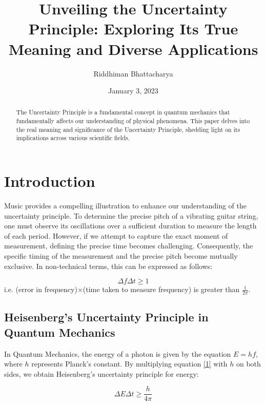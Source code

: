 \documentclass{article}
\begin{document}
\title{\Huge \textbf{Unveiling the Uncertainty Principle: Exploring Its True Meaning and Diverse Applications}}

\author{Riddhiman Bhattacharya}
\date{January 3, 2023}
\maketitle

\begin{abstract}
The Uncertainty Principle is a fundamental concept in quantum mechanics that fundamentally affects our understanding of physical phenomena. This paper delves into the real meaning and significance of the Uncertainty Principle, shedding light on its implications across various scientific fields.
\end{abstract}

\section{Introduction}

Music provides a compelling illustration to enhance our understanding of the uncertainty principle. To determine the precise pitch of a vibrating guitar string, one must observe its oscillations over a sufficient duration to measure the length of each period. However, if we attempt to capture the exact moment of measurement, defining the precise time becomes challenging. Consequently, the specific timing of the measurement and the precise pitch become mutually exclusive. In non-technical terms, this can be expressed as follows:

\begin{equation}
\Delta f \Delta t \geq {1} 
\label{1}
\end{equation}
i.e. (error in frequency)$\times$(time taken to measure frequency) is greater than $\frac{1}{2\pi}$\cite{Heisenbergs,Musicians}.

\large
\subsection*{Heisenberg’s Uncertainty Principle in Quantum Mechanics}
 

In Quantum Mechanics, the energy of a photon is given by the equation $E = hf$, where $h$ represents Planck's constant. By multiplying equation \eqref{1} with $h$ on both sides, we obtain Heisenberg's uncertainty principle for energy:

\begin{equation}
\Delta E \Delta t \geq \frac{h}{4\pi} 
\end{equation}
\end{document}
